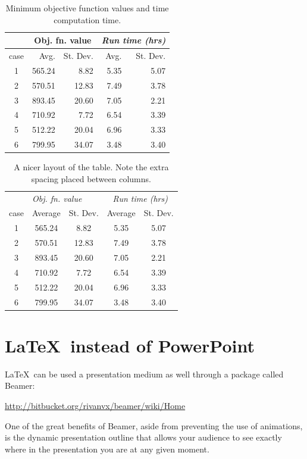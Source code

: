 \documentclass[12pt]{article}
\begin{document}
\begin{table}[tbp] %
\centering
\begin{tabular}{|c|rr|rr|}  %
\hline
 & \multicolumn{2}{c|}{\textbf{Obj. fn. value}} & \multicolumn{2}{c|}{\textit{Run time (hrs)}} \\
\hline
case &	Avg. & St. Dev. & Avg. & St. Dev. \\
\hline\hline
1 &	565.24 &	8.82 &	5.35 &	5.07 \\
2 &	570.51 &	12.83 &	7.49 &	3.78 \\
3 &	893.45 &	20.60 &	7.05 &	2.21 \\
4 &	710.92 &	7.72 &	6.54 &	3.39 \\
5 &	512.22 &	20.04 &	6.96 & 	3.33 \\
6 &	799.95 &	34.07 &	3.48 &	3.40 \\
\hline
\end{tabular}
\caption{Minimum objective function values and time computation time.}
\label{tbl:vals}
\end{table}


\begin{table}[tbp]
\centering
\begin{tabular}{c @{ \hspace{1cm} } cc @{\hspace{1cm}} cc @{\hspace{0.5cm}}}
\toprule
 & \multicolumn{2}{l}{\textit{Obj. fn. value}} & \multicolumn{2}{c}{\textit{Run time (hrs)}} \\
case & Average & St. Dev. & Average & St. Dev. \\ 
\midrule
1 &	565.24 &	8.82 &	5.35 &	5.07 \\
2 &	570.51 &	12.83 &	7.49 &	3.78 \\
3 &	893.45 &	20.60 &	7.05 &	2.21 \\
4 &	710.92 &	7.72 &	6.54 &	3.39 \\
5 &	512.22 &	20.04 &	6.96 & 	3.33 \\
6 &	799.95 &	34.07 &	3.48 &	3.40 \\
\bottomrule
\end{tabular}
\caption{A nicer layout of the table. Note the extra spacing placed between columns.}
\label{tbl:fancyvals}
\end{table}


\section{\LaTeX\ instead of PowerPoint}
\LaTeX\ can be used a presentation medium as well through a package called Beamer:
\begin{center} \url{http://bitbucket.org/rivanvx/beamer/wiki/Home} \end{center}
One of the great benefits of Beamer, aside from preventing the use of animations, is the dynamic presentation outline that allows your audience to see exactly where in the presentation you are at any given moment.
\end{document}
